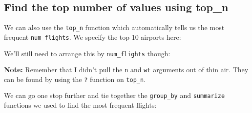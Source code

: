 \documentclass[]{tufte-book}
\newenvironment{Shaded}{\begin{snugshade}}{\end{snugshade}}
\newcommand{\KeywordTok}[1]{\textcolor[rgb]{0.13,0.29,0.53}{\textbf{{#1}}}}
\newcommand{\DataTypeTok}[1]{\textcolor[rgb]{0.13,0.29,0.53}{{#1}}}
\newcommand{\DecValTok}[1]{\textcolor[rgb]{0.00,0.00,0.81}{{#1}}}
\newcommand{\StringTok}[1]{\textcolor[rgb]{0.31,0.60,0.02}{{#1}}}
\newcommand{\NormalTok}[1]{{#1}}
\begin{document}
\subsection{Find the top number of values using
top\_n}\label{find-the-top-number-of-values-using-top_n}

We can also use the \texttt{top\_n} function which automatically tells
us the most frequent \texttt{num\_flights}. We specify the top 10
airports here:

\begin{Shaded}
\end{Shaded}

We'll still need to arrange this by \texttt{num\_flights} though:

\begin{Shaded}
\end{Shaded}

\textbf{Note:} Remember that I didn't pull the \texttt{n} and
\texttt{wt} arguments out of thin air. They can be found by using the
\texttt{?} function on \texttt{top\_n}.

We can go one stop further and tie together the \texttt{group\_by} and
\texttt{summarize} functions we used to find the most frequent flights:

\begin{Shaded}
\end{Shaded}
\end{document}
